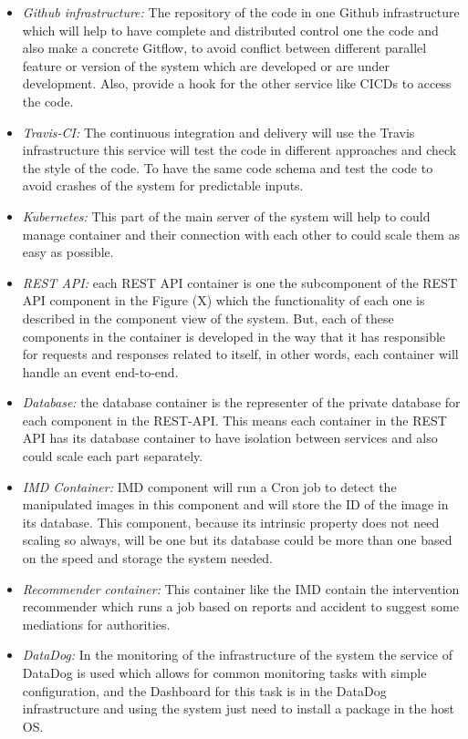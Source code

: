 \begin{itemize}
\item \emph{Github infrastructure:} The repository of the code in one Github infrastructure which will help to have complete and distributed control one the code and also make a concrete Gitflow, to avoid conflict between different parallel feature or version of the system which are developed or are under development. Also, provide a hook for the other service like CI\/CDs to access the code.\\
\item \emph{Travis-CI:} The continuous integration and delivery will use the Travis infrastructure this service will test the code in different approaches and check the style of the code. To have the same code schema and test the code to avoid crashes of the system for predictable inputs.
\item \emph{Kubernetes:} This part of the main server of the system will help to could manage container and their connection with each other to could scale them as easy as possible.
\item \emph{REST API:} each REST API container is one the subcomponent of the REST API component in the Figure (X) which the functionality of each one is described in the component view of the system. But, each of these components in the container is developed in the way that it has responsible for requests and responses related to itself, in other words, each container will handle an event end-to-end.
\item \emph{Database:} the database container is the representer of the private database for each component in the REST-API. This means each container in the REST API has its database container to have isolation between services and also could scale each part separately.
\item \emph{IMD Container:} IMD component will run a Cron job to detect the manipulated images in this component and will store the ID of the image in its database. This component, because its intrinsic property does not need scaling so always, will be one but its database could be more than one based on the speed and storage the system needed.
\item \emph{Recommender container:} This container like the IMD contain the intervention recommender which runs a job based on reports and accident to suggest some mediations for authorities.
\item \emph{DataDog:} In the monitoring of the infrastructure of the system the service of DataDog is used which allows for common monitoring tasks with simple configuration, and the Dashboard for this task is in the DataDog infrastructure and using the system just need to install a package in the host OS.

\end{itemize}
